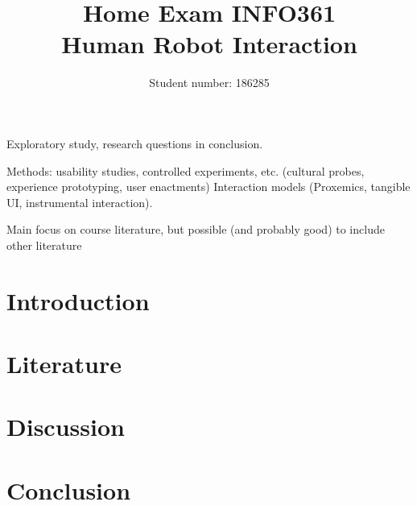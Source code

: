 \documentclass[a4paper,12pt]{article}
\title{Home Exam INFO361\\Human Robot Interaction}
\author{Student number: 186285}
\begin{document}
\maketitle
\thispagestyle{empty}
\newpage{}

\addtocounter{page}{-2}
\thispagestyle{empty}
\tableofcontents

\newpage{}

Exploratory study, research questions in conclusion.

Methods: usability studies, controlled experiments, etc. (cultural probes, experience prototyping, user enactments)
Interaction models (Proxemics, tangible UI, instrumental interaction).

Main focus on course literature, but possible (and probably good) to include other literature

\section{Introduction}


\section{Literature}


\section{Discussion}


\section{Conclusion}



% 

% 
\newpage{}

\printbibliography
\end{document}
